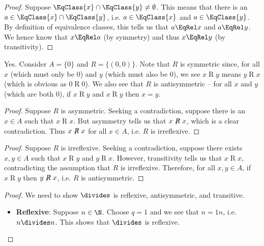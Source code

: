 \begin{questions}
    \item \begin{proof}
        Suppose $\EqClass{x} \cap \EqClass{y} \neq \emptyset$. This means that there is an $a \in \EqClass{x} \cap \EqClass{y}$, i.e. $a \in \EqClass{x}$ and $a \in \EqClass{y}$. By definition of equivalence classes, this tells us that $a \EqRel x$ and $a \EqRel y$. We hence know that $x \EqRel a$ (by symmetry) and thus $x \EqRel y$ (by transitivity).
    \end{proof}

    \item Yes. Consider $A = \{0\}$ and $R = \{(0, 0)\}$. Note that $R$ is symmetric since, for all $x$ (which must only be 0) and $y$ (which must also be 0), we see $x \mathrel{R} y$ means $y \mathrel{R} x$ (which is obvious as $0 \mathrel{R} 0$). We also see that $R$ is antisymmetric -- for all $x$ and $y$ (which are both 0), if $x\mathrel{R} y$ and $x \mathrel{R} y$ then $x = y$.
    
    \item \begin{partquestions}{\alph*}
        \item \begin{proof}
            Suppose $R$ is asymmetric. Seeking a contradiction, suppose there is an $x \in A$ such that $x \mathrel{R} x$. But asymmetry tells us that $x \not\mathrel{R} x$, which is a clear contradiction. Thus $x \not\mathrel{R} x$ for all $x \in A$, i.e. $R$ is irreflexive.
        \end{proof}
        \item \begin{proof}
            Suppose $R$ is irreflexive. Seeking a contradiction, suppose there exists $x, y \in A$ such that $x \mathrel{R} y$ and $y \mathrel{R} x$. However, transitivity tells us that $x \mathrel{R} x$, contradicting the assumption that $R$ is irreflexive. Therefore, for all $x, y \in A$, if $x \mathrel{R} y$ then $y \not\mathrel{R} x$, i.e. $R$ is antisymmetric.
        \end{proof}
    \end{partquestions}

    \item \begin{proof}
        We need to show $\divides$ is reflexive, antisymmetric, and transitive.
        \begin{itemize}
            \item \textbf{Reflexive}: Suppose $n \in \N$. Choose $q = 1$ and we see that $n = 1n$, i.e. $n \divides n$. This shows that $\divides$ is reflexive.
            

\end{itemize}
\end{proof}
\end{questions}
